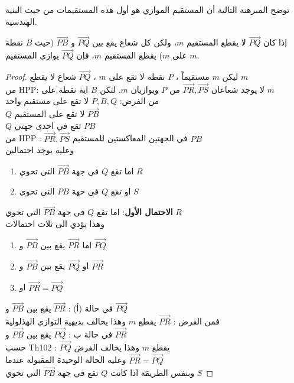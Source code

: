 \begin{note}توضح المبرهنة التالية أن المستقيم الموازي هو أول هذه المستقيمات من حيث البنية الهندسية.
\end{note}

\begin{theorem}
	إذا كان $\overrightarrow{PQ}$ لا يقطع المستقيم $m$، ولكن كل شعاع يقع بين $\overrightarrow{PQ}$ و $\overrightarrow{PB}$ (حيث $B$ نقطة على $m$) يقطع المستقيم $m$، فإن $\overrightarrow{PQ}$ يوازي المستقيم $m$.
\end{theorem}

\begin{proof}
	ليكن $m$ مستقيماً ، $P$ نقطة لا تقع على $m$ ، $\overrightarrow{PQ}$ شعاع لا يقطع $m$\\
	من HPP: لا يوجد شعاعان 
	$\overrightarrow{PR}, \overrightarrow{PS}$ من $P$ ويوازيان $m$. لتكن $B$ اية نقطة على $m$\\
	من الفرض: $P, B, Q$ لا تقع على مستقيم واحد\\
	$Q$ لا تقع على المستقيم $\overrightarrow{PB}$\\
	$Q$ تقع في احدى جهتي $PB$\\
من HPP : $\overrightarrow{PR}, \overrightarrow{PS}$ في الجهتين المعاكستين للمستقيم $PB$\\
وعليه يوجد احتمالين 
\begin{enumerate}
	\item اما تقع $Q$ في جهة $\overrightarrow{PB}$ التي تحوي $R$
	\item او تقع $Q$ في حهة $PB$ التي تحوي $S$
\end{enumerate}
\textbf{الاحتمال الأول}: اما تقع $Q$ في جهة $\overrightarrow{PB}$ التي تحوي $R$\\
وهذا يؤدي الى ثلاث احتمالات
\begin{enumerate}[label*=\textbf{\xslalph* -}]
	\item اما $\overrightarrow{PR}$ يقع بين $\overrightarrow{PB}$ و $\overrightarrow{PQ}$
	\item او $\overrightarrow{PQ}$ يقع بين $\overrightarrow{PB}$ و $\overrightarrow{PR}$
	\item او $\overrightarrow{PR}  = \overrightarrow{PQ}$ 
\end{enumerate}
في حالة (أ) : $\overrightarrow{PR}$ يقع بين $\overrightarrow{PB}$ و $\overrightarrow{PQ}$\\
فمن الفرض : 
$\overrightarrow{PR}$ يقطع $m$ وهذا يخالف بديهية التوازي الهذلولية\\
في حالة ب : $\overrightarrow{PQ}$ يقع بين $\overrightarrow{PB}$ و $\overrightarrow{PR}$\\
حسب Th102 : 
$\overrightarrow{PQ}$ يقطع $m$ وهذا يخالف الفرض\\
وعليه الحالة الوحيدة المقبولة عندما $\overrightarrow{PR}  = \overrightarrow{PQ}$\\
وبنفس الطريقة اذا كانت $Q$ تقع في جهة $\overrightarrow{PB}$ التي تحوي $S$
\end{proof}
